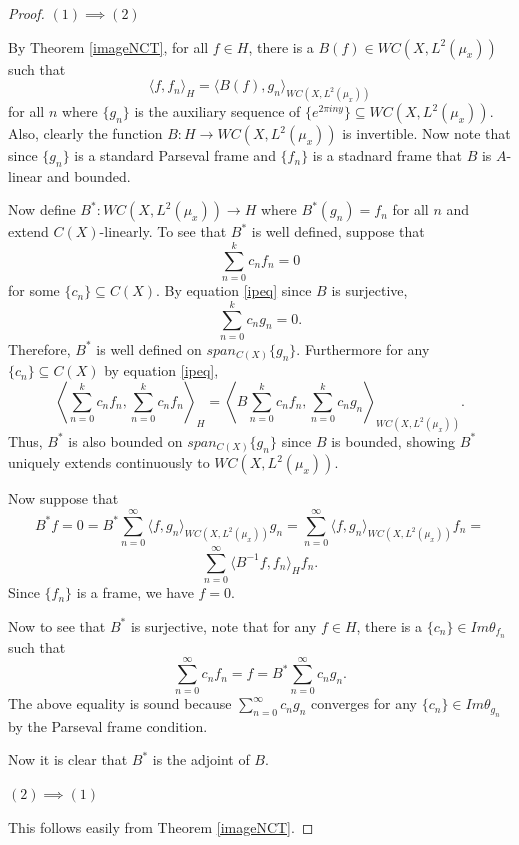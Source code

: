 \documentclass[10pt,a4paper]{amsart}
\begin{document}
\begin{proof}
$(1)\implies (2)$

By Theorem \ref{imageNCT}, for all $f\in H$, there is a $B(f)\in WC(X, L^{2}(\mu_{x}))$ such that
\begin{equation}\label{ipeq}
\langle f, f_{n}\rangle_{H} =\langle B(f), g_{n}\rangle_{WC(X, L^{2}(\mu_{x}))} 
\end{equation} for all $n$ where $\{g_{n}\}$ is the auxiliary sequence of $\{e^{2\pi i ny}\}\subseteq WC(X, L^{2}(\mu_{x}))$. Also, clearly the function $B: H\to WC(X, L^{2}(\mu_{x}))$ is invertible. Now note that since $\{g_{n}\}$ is a standard Parseval frame and $\{f_{n}\}$ is a stadnard frame that $B$ is $A$-linear and bounded.

Now define $B^{*}: WC(X, L^{2}(\mu_{x}))\to H$ where $B^{*}(g_{n})=f_{n}$ for all $n$ and extend $C(X)$-linearly. To see that $B^{*}$ is well defined,
suppose that
$$\sum_{n=0}^{k}c_{n}f_{n}=0$$ for some $\{c_{n}\}\subseteq C(X)$. By equation \ref{ipeq} since $B$ is surjective,
$$\sum_{n=0}^{k}c_{n}g_{n}=0.$$ Therefore, $B^{*}$ is well defined on $span_{C(X)}\{g_{n}\}$.
Furthermore for any $\{c_{n}\}\subseteq C(X)$ by equation \ref{ipeq},
$$\left \langle \sum_{n=0}^{k}c_{n}f_{n}, \sum_{n=0}^{k}c_{n}f_{n} \right\rangle_{H}=\left\langle B\sum_{n=0}^{k}c_{n}f_{n},\sum_{n=0}^{k}c_{n}g_{n} \right\rangle_{WC(X, L^{2}(\mu_{x}))}.$$
Thus, $B^{*}$ is also bounded on $span_{C(X)}\{g_{n}\}$ since $B$ is bounded, showing $B^{*}$ uniquely extends continuously to $WC(X, L^{2}(\mu_{x}))$.

Now suppose that $$B^{*}f=0=B^{*}\sum_{n=0}^{\infty}\langle f, g_{n}\rangle_{WC(X, L^{2}(\mu_{x}))}g_{n}=\sum_{n=0}^{\infty}\langle f, g_{n}\rangle_{WC(X, L^{2}(\mu_{x}))}f_{n}=$$
$$\sum_{n=0}^{\infty}\langle B^{-1}f, f_{n}\rangle_{H}f_{n}.$$
Since $\{f_{n}\}$ is a frame, we have $f=0$.

Now to see that $B^{*}$ is surjective, note that for any $f\in H$, there is a $\{c_{n}\}\in Im\theta_{f_{n}}$ such that
$$\sum_{n=0}^{\infty}c_{n}f_{n}=f=B^{*}\sum_{n=0}^{\infty}c_{n}g_{n}.$$ The above equality is sound because $\sum_{n=0}^{\infty}c_{n}g_{n}$ converges for any $\{c_{n}\}\in Im\theta_{g_{n}}$ by the Parseval frame condition.

Now it is clear that $B^{*}$ is the adjoint of $B$.

$(2)\implies (1)$

This follows easily from Theorem \ref{imageNCT}.
\end{proof}
\end{document}
